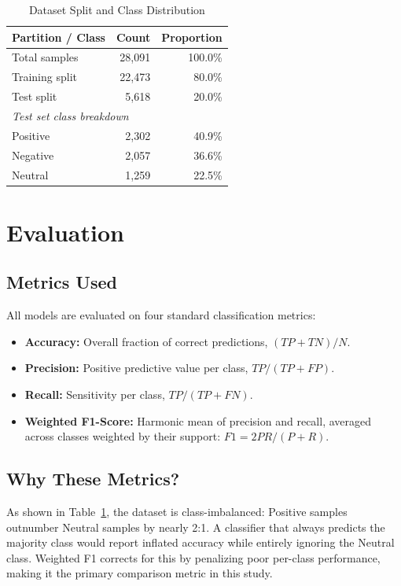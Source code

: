 \documentclass[conference]{IEEEtran}
\begin{document}
\begin{table}[h]
\centering
\caption{Dataset Split and Class Distribution}
\label{tab:data_stats}
\begin{tabular}{lrr}
\toprule
\textbf{Partition / Class} & \textbf{Count} & \textbf{Proportion} \\
\midrule
Total samples    & 28,091 & 100.0\% \\
Training split   & 22,473 & 80.0\%  \\
Test split       & 5,618  & 20.0\%  \\
\midrule
\multicolumn{3}{l}{\textit{Test set class breakdown}} \\
Positive         & 2,302  & 40.9\%  \\
Negative         & 2,057  & 36.6\%  \\
Neutral          & 1,259  & 22.5\%  \\
\bottomrule
\end{tabular}
\end{table}

\section{Evaluation}

\subsection{Metrics Used}
All models are evaluated on four standard classification metrics:
\begin{itemize}
    \item \textbf{Accuracy:} Overall fraction of correct predictions, $(TP + TN) / N$.
    \item \textbf{Precision:} Positive predictive value per class, $TP / (TP + FP)$.
    \item \textbf{Recall:} Sensitivity per class, $TP / (TP + FN)$.
    \item \textbf{Weighted F1-Score:} Harmonic mean of precision and recall, averaged across classes weighted by their support: $F1 = 2PR/(P+R)$.
\end{itemize}

\subsection{Why These Metrics?}
As shown in Table~\ref{tab:data_stats}, the dataset is class-imbalanced: Positive samples outnumber Neutral samples by nearly 2:1. A classifier that always predicts the majority class would report inflated accuracy while entirely ignoring the Neutral class. Weighted F1 corrects for this by penalizing poor per-class performance, making it the primary comparison metric in this study.
\end{document}
